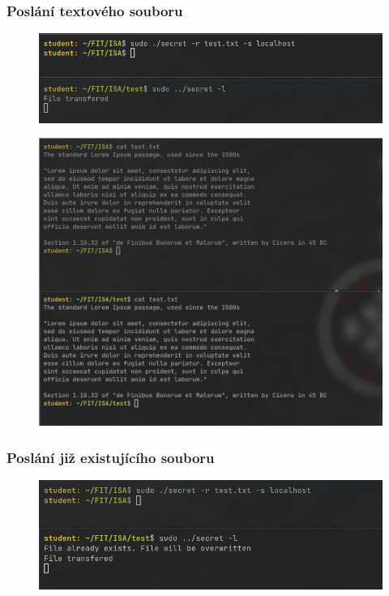 \documentclass[11pt, a4paper]{article}
\begin{document}
\begin{flushleft}


\subsubsection{Poslání textového souboru}

\begin{figure}[H]
    \centering
    \includegraphics[scale=0.6, keepaspectratio]{img/send_txt.png}
    \label{fig:txt}
 \end{figure}
 
 \begin{figure}[H]
    \centering
    \includegraphics[scale=0.5, keepaspectratio]{img/cmp_txt.png}
    \label{fig:txt}
 \end{figure}



\subsubsection{Poslání již existujícího souboru}

\begin{figure}[H]
    \centering
    \includegraphics[scale=0.63, keepaspectratio]{img/send_dup_txt.png}
    \label{fig:txt}
 \end{figure}


\end{flushleft}
\end{document}
